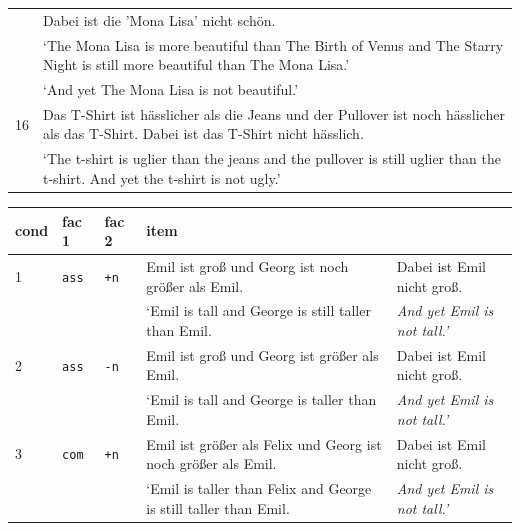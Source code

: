 \documentclass[output=paper]{langsci/langscibook}
\begin{document}
\begin{longtable}{lp{317.90625pt}}
   & Dabei ist die 'Mona Lisa' nicht schön. \\
   & {`The Mona Lisa is more beautiful than The Birth of Venus and The Starry Night is still more beautiful than The Mona Lisa.'}\\
   & {`And yet The Mona Lisa is not beautiful.'}\\
\midrule
16 & Das T-Shirt ist hässlicher als die Jeans und der Pullover ist noch hässlicher als das T-Shirt. Dabei ist das T-Shirt nicht hässlich.\\
   & {`The t-shirt is uglier than the jeans and the pullover is still uglier than the t-shirt. And yet the t-shirt is not ugly.'}\\
\end{longtable}


\begin{table}
\begin{tabular}{lllll}
\lsptoprule
cond & fac 1 & fac 2 & item & \\
\midrule
1 & \texttt{ass} & \texttt{+n} & Emil ist groß \hspace{25pt} und Georg ist noch größer als Emil. & Dabei ist Emil nicht groß. \\
 & & & {`Emil is tall \hspace{32pt} and George is \hspace{0.4pt} still \hspace{2pt} taller than Emil.} & \textit{And yet Emil is not tall.'} \\
\midrule
2 & \texttt{ass} & \texttt{-n} & Emil ist groß \hspace{25pt} und Georg ist \hspace{16pt} größer als Emil. & Dabei ist Emil nicht groß. \\
 & & & {`Emil is tall \hspace{32pt} and George is \hspace{19pt} taller than Emil.} & \textit{And yet Emil is not tall.'}   \\
\midrule
3 & \texttt{com} & \texttt{+n} & Emil ist größer als Felix \hspace{0.65pt} und Georg ist noch größer als Emil. & Dabei ist Emil nicht groß.   \\
 & & & {`Emil is taller than Felix \hspace{2pt} and George is \hspace{0.4pt} still \hspace{2pt} taller than Emil.} & \textit{And yet Emil is not tall.'}  \\

\end{tabular}
\end{table}
\end{document}
